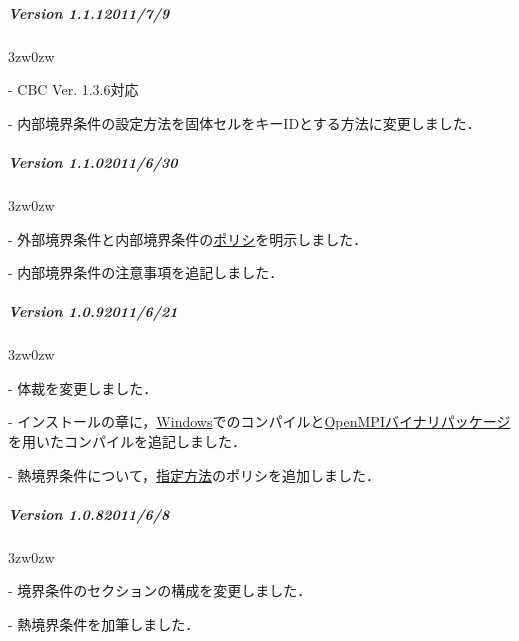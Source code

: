 {\vspace{3mm}

%
\subparagraph{Version 1.1.1\hspace{1cm}2011/7/9}

\begin{description}
\begin{indentation}{3zw}{0zw}
\item[-] CBC Ver. 1.3.6対応
\item[-] 内部境界条件の設定方法を固体セルをキーIDとする方法に変更しました．
\end{indentation}
\end{description}

\vspace{3mm}

%
\subparagraph{Version 1.1.0\hspace{1cm}2011/6/30}

\begin{description}
\begin{indentation}{3zw}{0zw}
\item[-] 外部境界条件と内部境界条件の\hyperlink{tgt:BC policy}{ポリシ}を明示しました．
\item[-] 内部境界条件の注意事項を追記しました．
\end{indentation}
\end{description}

\vspace{3mm}

%
\subparagraph{Version 1.0.9\hspace{1cm}2011/6/21}

\begin{description}
\begin{indentation}{3zw}{0zw}
\item[-] 体裁を変更しました．
\item[-] インストールの章に，\hyperlink{tgt:win_compile}{Windows}でのコンパイルと\hyperlink{tgt:win_opmi_binary}{OpenMPIバイナリパッケージ}を用いたコンパイルを追記しました．
\item[-] 熱境界条件について，\hyperlink{tgt:spec of heat bc}{指定方法}のポリシを追加しました．
\end{indentation}
\end{description}

\vspace{3mm}

%
\subparagraph{Version 1.0.8\hspace{1cm}2011/6/8}

\begin{description}
\begin{indentation}{3zw}{0zw}
\item[-] 境界条件のセクションの構成を変更しました．
\item[-] 熱境界条件を加筆しました．
\end{indentation}
\end{description}

}
